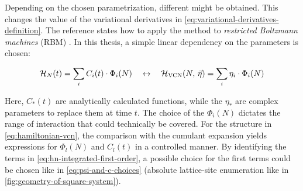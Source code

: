 Depending on the chosen parametrization, different \Hvcn{\vec{\eta}} might be obtained. 
This changes the value of the variational derivatives in \autoref{eq:variational-derivatives-definition}.
The reference \cite{VCNsolutionForRBM} states how to apply the method to \emph{restricted Boltzmann machines} (RBM) \cite{neuralNetworkQuantumStates}.
In this thesis, a simple linear dependency on the parameters is chosen:

\begin{equation}
    \label{eq:hamiltonian-vcn}
    \HNOft = \lsum[i] C_i(t) \cdot \Phi_i(N) \quad\leftrightarrow\quad \Hvcn{\vec{\eta}} = \lsum[i] \eta_i \cdot \Phi_i(N)
\end{equation}

Here, $C_\ast(t)$ are analytically calculated functions, while the $\eta_\ast$ are complex parameters to replace them at time $t$.
The choice of the $\Phi_i(N)$ dictates the range of interaction that could technically be covered.
For the structure in \autoref{eq:hamiltonian-vcn}, the comparison with the cumulant expansion yields expressions for $\Phi_l(N)$ and $C_l(t)$ in a controlled manner.
By identifying the terms in \autoref{eq:hn-integrated-first-order}, a possible choice for the first terms could be chosen like in \autoref{eq:psi-and-c-choices} (absolute lattice-site enumeration like in \autoref{fig:geometry-of-square-system}). 

